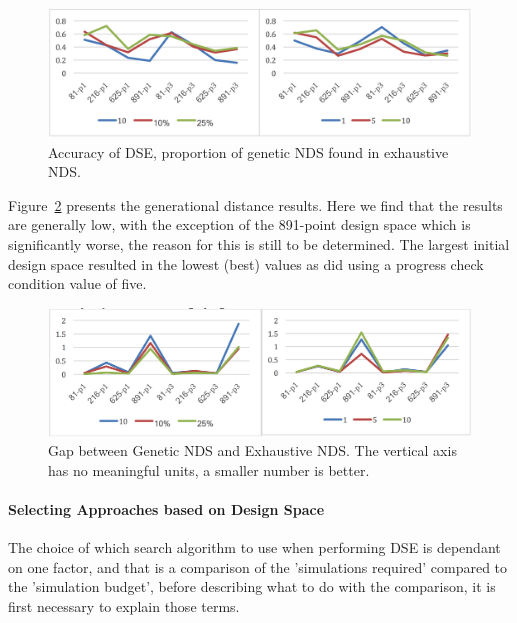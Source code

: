 \begin{figure}[p]
	\centering
	\includegraphics[width=1\textwidth]{figures/ga_accuracy}
	\caption{Accuracy of DSE, proportion of genetic NDS found in exhaustive NDS.}
	\label{fig:acc_ga_ex}
\end{figure}
Figure~\ref{fig:gap_ga_ex} presents the generational distance results.  Here we find that the results are generally low, with the exception of the 891-point design space which is significantly worse, the reason for this is still to be determined.  The largest initial design space resulted in the lowest (best) values as did using a progress check condition value of five.


\begin{figure}[p]
	\centering
	\includegraphics[width=1\textwidth]{figures/ga_distance}
	\caption{Gap between Genetic NDS and Exhaustive NDS.  The vertical axis has no meaningful units, a smaller number is better.}
	\label{fig:gap_ga_ex}
\end{figure}

\paragraph{Selecting Approaches based on Design Space}


The choice of which search algorithm to use when performing DSE is dependant on one factor, and that is a comparison of the 'simulations required' compared to the 'simulation budget',  before describing what to do with the comparison, it is first necessary to explain those terms.

